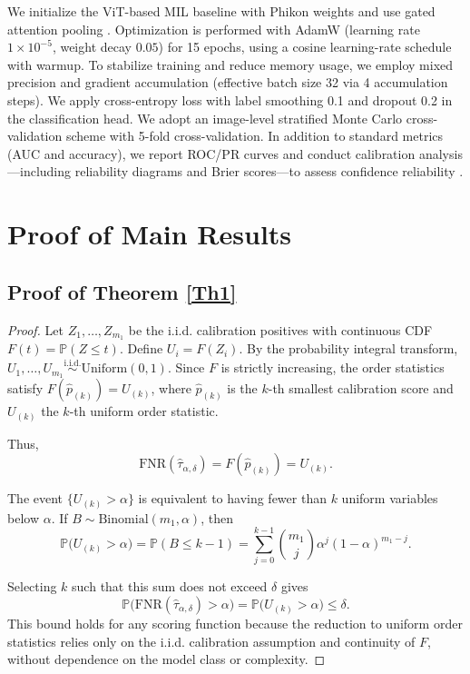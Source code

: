 \documentclass[sigconf,review,anonymous]{acmart}
\theoremstyle{remark}
\begin{document}
We initialize the ViT-based MIL baseline with Phikon weights \cite{filiot2023scaling} and use gated attention pooling \cite{ilse2018attention}. Optimization is performed with AdamW \cite{loshchilov2017decoupled} (learning rate $1\times10^{-5}$, weight decay $0.05$) for 15 epochs, using a cosine learning-rate schedule with warmup. To stabilize training and reduce memory usage, we employ mixed precision \cite{micikevicius2017mixed} and gradient accumulation (effective batch size 32 via 4 accumulation steps).
We apply cross-entropy loss with label smoothing 0.1 \cite{szegedy2016rethinking} and dropout 0.2 in the classification head. We adopt an image-level stratified Monte Carlo cross-validation scheme with 5-fold cross-validation. In addition to standard metrics (AUC and accuracy), we report ROC/PR curves and conduct calibration analysis---including reliability diagrams and Brier scores---to assess confidence reliability \cite{guo2017calibration}.

\section{Proof of Main Results}\label{S6}

\subsection{Proof of Theorem \ref{Th1}}\label{S6-1}

\begin{proof}
Let $Z_1, \dots, Z_{m_1}$ be the i.i.d. calibration positives with continuous CDF $F(t) = \mathbb{P}(Z \leq t)$. 
Define $U_i = F(Z_i)$. 
By the probability integral transform, $U_1, \dots, U_{m_1} \stackrel{\text{i.i.d.}}{\sim} \mathrm{Uniform}(0,1)$. 
Since $F$ is strictly increasing, the order statistics satisfy $F(\hat{p}_{(k)}) = U_{(k)}$, where $\hat{p}_{(k)}$ is the $k$-th smallest calibration score and $U_{(k)}$ the $k$-th uniform order statistic.  

Thus,
\[
\mathrm{FNR}(\hat{\tau}_{\alpha,\delta}) = F(\hat{p}_{(k)}) = U_{(k)}.
\]

The event $\{U_{(k)} > \alpha\}$ is equivalent to having fewer than $k$ uniform variables below $\alpha$. 
If $B \sim \mathrm{Binomial}(m_1, \alpha)$, then
\[
\mathbb{P}\bigl(U_{(k)} > \alpha\bigr) 
= \mathbb{P}(B \le k-1) 
= \sum_{j=0}^{k-1} \binom{m_1}{j} \alpha^j (1-\alpha)^{m_1-j}.
\]

Selecting $k$ such that this sum does not exceed $\delta$ gives
\[
\mathbb{P}\bigl(\mathrm{FNR}(\hat{\tau}_{\alpha,\delta}) > \alpha\bigr) = \mathbb{P}\bigl(U_{(k)} > \alpha\bigr) \le \delta.
\]
This bound holds for any scoring function because the reduction to uniform order statistics relies only on the i.i.d. calibration assumption and continuity of $F$, without dependence on the model class or complexity.
\end{proof}
\end{document}
